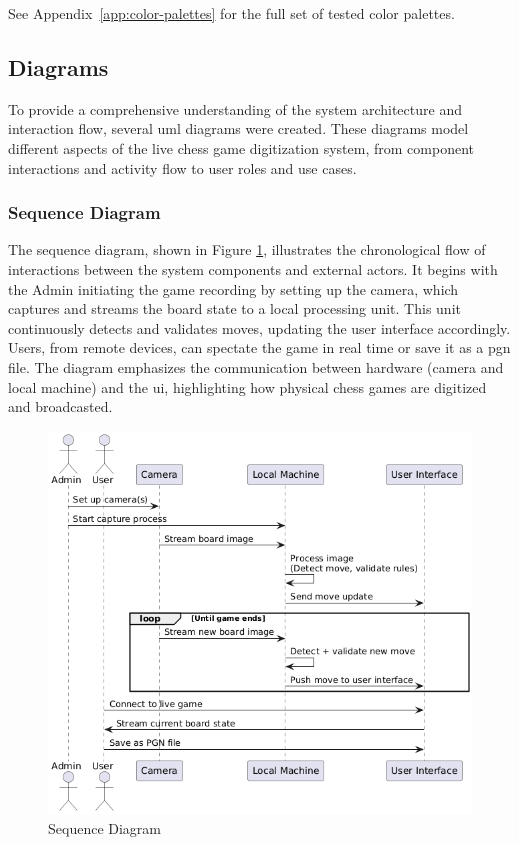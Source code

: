 See Appendix~\ref{app:color-palettes} for the full set of tested color palettes.

\subsection{Diagrams}
\label{subsec:diagrams}

To provide a comprehensive understanding of the system architecture and interaction flow, several \gls{uml} diagrams were created. These diagrams model different aspects of the live chess game digitization system, from component interactions and activity flow to user roles and use cases.

\subsubsection*{Sequence Diagram}
\label{subsubsec:sequence-diagram}

The sequence diagram, shown in Figure \ref{fig:sequence}, illustrates the chronological flow of interactions between the system components and external actors. It begins with the Admin initiating the game recording by setting up the camera, which captures and streams the board state to a local processing unit. This unit continuously detects and validates moves, updating the user interface accordingly. Users, from remote devices, can spectate the game in real time or save it as a \gls{pgn} file. The diagram emphasizes the communication between hardware (camera and local machine) and the \gls{ui}, highlighting how physical chess games are digitized and broadcasted.

\begin{figure}[h!]
    \centering
    \includegraphics[width=0.75\linewidth]{figures/methods/uml/sequence.png}
    \caption[Sequence Diagram]{Sequence Diagram}
    \label{fig:sequence}
\end{figure}


